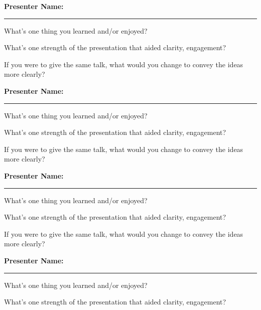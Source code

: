 \documentclass[11pt]{article}
\begin{document}
\noindent
\textbf{Presenter Name:} \rule{10cm}{1pt}

\bigskip
\noindent
What's one thing you learned and/or enjoyed?

\vspace{0.5in}

\noindent
What's one strength of the presentation that aided clarity, engagement?

\vspace{0.5in}

\noindent
If you were to give the same talk, what would you change to convey the ideas more clearly?
\vspace{0.75in}

\noindent
\textbf{Presenter Name:} \rule{10cm}{1pt}

\bigskip
\noindent
What's one thing you learned and/or enjoyed?

\vspace{0.5in}

\noindent
What's one strength of the presentation that aided clarity, engagement?

\vspace{0.5in}

\noindent
If you were to give the same talk, what would you change to convey the ideas more clearly?

\vspace{0.75in}
\noindent
\textbf{Presenter Name:} \rule{10cm}{1pt}

\bigskip
\noindent
What's one thing you learned and/or enjoyed?

\vspace{0.5in}

\noindent
What's one strength of the presentation that aided clarity, engagement?

\vspace{0.5in}

\noindent
If you were to give the same talk, what would you change to convey the ideas more clearly?

\pagebreak
\noindent
\textbf{Presenter Name:} \rule{10cm}{1pt}

\bigskip
\noindent
What's one thing you learned and/or enjoyed?

\vspace{0.5in}

\noindent
What's one strength of the presentation that aided clarity, engagement?
\end{document}
